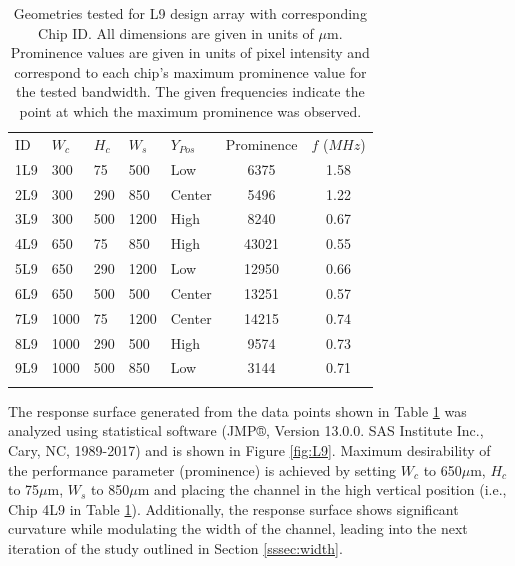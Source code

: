 
\begin{table}[h]
\caption[Geometries tested for L9 design array]{Geometries tested for L9 design array with corresponding Chip ID. All dimensions are given in units of $\mu$m. Prominence values are given in units of pixel intensity and correspond to each chip's maximum prominence value for the tested bandwidth. The given frequencies indicate the point at which the maximum prominence was observed.}
\label{tab:geometries}       %
\centering
\begin{tabular}{lllll|cc}
\hline\noalign{\smallskip}
ID & $W_c$ & $H_c$ & $W_s$ & $Y_{Pos}$ & Prominence & $f$ ($MHz$) \\
\noalign{\smallskip}\hline\noalign{\smallskip}
1L9 & 300 & 75 & 500 & Low & 6375 & 1.58\\
2L9 & 300 & 290 & 850 & Center & 5496 & 1.22\\
3L9 & 300 & 500 & 1200 & High & 8240 & 0.67\\
4L9 & 650 & 75 & 850 & High & 43021 & 0.55\\
5L9 & 650 & 290 & 1200 & Low & 12950 & 0.66\\
6L9 & 650 & 500 & 500 & Center & 13251 & 0.57\\
7L9 & 1000 & 75 & 1200 & Center & 14215 & 0.74\\
8L9 & 1000 & 290 & 500 & High & 9574 & 0.73\\
9L9 & 1000 & 500 & 850 & Low & 3144 & 0.71\\
\noalign{\smallskip}\hline
\end{tabular}
\end{table}

The response surface generated from the data points shown in Table \ref{tab:geometries} was analyzed using statistical software (JMP®, Version 13.0.0. SAS Institute Inc., Cary, NC, 1989-2017) and is shown in Figure \ref{fig:L9}. Maximum desirability of the performance parameter (prominence) is achieved by setting $W_c$ to 650$\mu$m, $H_c$ to 75$\mu$m, $W_s$ to 850$\mu$m and placing the channel in the high vertical position (i.e., Chip 4L9 in Table \ref{tab:geometries}). Additionally, the response surface shows significant curvature while modulating the width of the channel, leading into the next iteration of the study outlined in Section \ref{sssec:width}.

